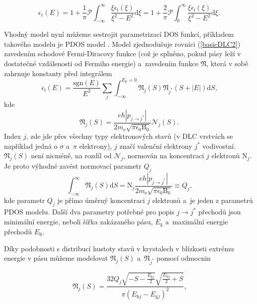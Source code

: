 \begin{equation}
\epsilon_\mathrm{r}(E) = 
1 + \frac{1}{\pi} \mathcal{P} \int_{-\infty}^\infty \frac{\xi \epsilon_\mathrm{i}(\xi)}{\xi^2 - E^2} \mathrm{d}\xi = 
1 + \frac{2}{\pi} \mathcal{P} \int_0^\infty \frac{\xi \epsilon_\mathrm{i}(\xi)}{\xi^2 - E^2} \mathrm{d}\xi 
\text{.}
\end{equation}


Vhodný model nyní můžeme sestrojit parametrizací DOS funkcí, příkladem takového modelu je PDOS model \cite{Franta2007}. Model zjednodušuje rovnici (\ref{basicDLC2}) zavedením schodové Fermi-Diracovy funkce (což je splněno, pokud pásy leží v dostatečné vzdálenosti od Fermiho energie) a~zavedením funkce $\mathfrak{N}$, která v sobě zahrnuje konstanty před integrálem 
\begin{equation}
\label{epsilonDOS}
\epsilon_\mathrm{i}(E) = \frac{\mathrm{sgn}(E)}{E^2} \sum_{j} \int_{-\infty}^{E_\mathrm{F} = 0} \mathfrak{N}_j(S) \mathfrak{N}_{j^*}(S + |E|)\mathrm{d}S \text{,}
\end{equation}
kde
\begin{equation}
\label{unormN}
\mathfrak{N}_j(S) = \frac{eh | p_{j \rightarrow j^*} |}{2 m_\mathrm{e} \sqrt{\pi \epsilon_0 \mathrm{B}_0}} \mathcal{N}_j(S) \text{.}
\end{equation}
Index $j$, zde jde přes všechny typy elektronových stavů (v DLC vrstvách se například jedná o $\sigma$ a~$\pi$ elektrony), $j$ značí valenční elektrony $j^*$ vodivostní. $\mathfrak{N}_j(S)$ není nicméně, na rozdíl od $\mathcal{N}_j$, normován na koncentraci $j$ elektronů $\mathrm{N}_j$. Je proto výhodné zavést normovací parametr $Q_j$
\begin{equation}
\int_{-\infty}^\infty \mathfrak{N}_j(S) \mathrm{d}S = 
\mathrm{N}_j \frac{eh | p_{j \rightarrow j^*} |}{2 m_\mathrm{e} \sqrt{\pi \epsilon_0 \mathrm{B}_0}} \equiv
Q_j \text{,}
\end{equation}
kde parametr $Q_j$ je přímo úměrný koncentraci $j$ elektronů a~je jeden z parametrů PDOS modelu. Další dva parametry potřebné pro popis $j \rightarrow j^*$ přechodů jsou minimální energie, neboli šířka zakázaného pásu, $E_\mathrm{g}$ a~maximální energie přechodů $E_\mathrm{h}$. 

Díky podobnosti s distribucí hustoty stavů v krystalech v blízkosti extrému energie v pásu můžeme modelovat $\mathfrak{N}_j(S)$ a~$\mathfrak{N}_{j^*}$ pomocí odmocnin

\begin{equation}
\label{N1}
 \mathfrak{N}_j(S) = 
\frac{
		32Q_j 
		\sqrt{-S-\frac{E_{\mathrm{g}j}}{2}}
		\sqrt{\frac{E_{\mathrm{h}j}}{2}+S}
	}{
		\pi (E_{\mathrm{h}j} - E_{\mathrm{g}j})^2
	}
\text{,}
\end{equation}

